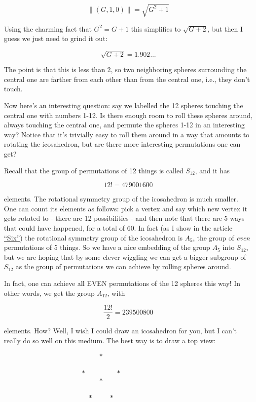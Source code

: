 \documentclass{article}
\begin{document}
\[\|(G,1,0)\| = \sqrt{G^2 + 1}\]

Using the charming fact that \(G^2 = G + 1\) this simplifies to
\(\sqrt{G + 2}\), but then I guess we just need to grind it out:

\[\sqrt{G + 2} =  1.902\ldots\]

The point is that this is less than 2, so two neighboring spheres
surrounding the central one are farther from each other than from the
central one, i.e., they don't touch.

Now here's an interesting question: say we labelled the 12 spheres
touching the central one with numbers 1-12. Is there enough room to roll
these spheres around, always touching the central one, and permute the
spheres 1-12 in an interesting way? Notice that it's trivially easy to
roll them around in a way that amounts to rotating the icosahedron, but
are there more interesting permutations one can get?

Recall that the group of permutations of 12 things is called \(S_{12}\),
and it has

\[12! = 479001600\]

elements. The rotational symmetry group of the icosahedron is much
smaller. One can count its elements as follows: pick a vertex and say
which new vertex it gets rotated to - there are 12 possibilities - and
then note that there are 5 ways that could have happened, for a total of
60. In fact (as I show in the article
\href{http://math.ucr.edu/home/baez/six.html}{``Six''}) the rotational
symmetry group of the icosahedron is \(A_5\), the group of \emph{even}
permutations of 5 things. So we have a nice embedding of the group
\(A_5\) into \(S_{12}\), but we are hoping that by some clever wiggling
we can get a bigger subgroup of \(S_{12}\) as the group of permutations
we can achieve by rolling spheres around.

In fact, one can achieve all EVEN permutations of the 12 spheres this
way! In other words, we get the group \(A_{12}\), with

\[\frac{12!}{2} = 239500800\]

elements. How? Well, I wish I could draw an icosahedron for you, but I
can't really do so well on this medium. The best way is to draw a top
view:

\begin{verbatim}
                           *
 
                      *         *
                           *
                        
                        *     *
\end{verbatim}
\end{document}
